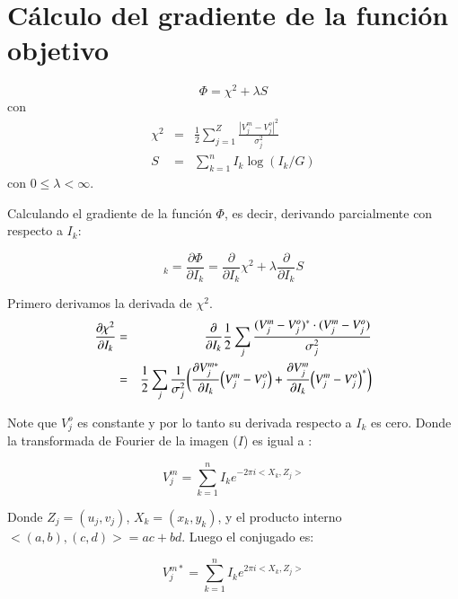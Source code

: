 \chapter{Cálculo del gradiente de la función objetivo}
\label{apendice:dphi}
\begin{equation}
\Phi = \chi^2 + \lambda S
\end{equation}
con
\begin{eqnarray}
\chi^2 & = & \frac{1}{2}\sum^{Z}_{j=1}{\frac{|V^{m}_{j} - V_{j}^{o}|^{2}}{\sigma_j^{2}}} \\
S & = & \sum^{n}_{k=1}{I_{k}\log{(I_{k}/G)}}
\end{eqnarray}
con $0 \leq \lambda < \infty$.

Calculando el gradiente de la función $\Phi$, es decir, derivando parcialmente con respecto a $I_{k}$:

\begin{equation}
[\nabla\Phi]_k = \frac{\partial \Phi}{\partial I_{k}} = \frac{\partial}{\partial I_{k}} \chi^{2} + \lambda \frac{\partial}{\partial I_{k}}S
\label{eq:fina}
\end{equation}



Primero derivamos la derivada de $\chi^2$.
\begin{eqnarray}
\frac{\partial\chi^{2}}{\partial I_{k}} & = & \frac{\partial}{\partial I_{k}}\frac{1}{2}\sum\limits_{j}\frac{(V^{m}_{j} - V_{j}^{o})^{*}\cdot(V^{m}_{j} - V_{j}^{o})}{\sigma_{j}^{2}}\\
                                        & = & \frac{1}{2}\sum\limits_{j}\frac{1}{\sigma_{j}^{2}}\bigg(\frac{\partial
                                         V^{m*}_{j}}{\partial I_{k}}\Bigl( V_{j}^{m} - V_{j}^{o}\Bigr)+\frac{\partial V_{j}^{m}}{\partial I_{k}}\Bigl(V_{j}^{m}- V_{j}^{o}\Bigr)^{*}\biggr)
\end{eqnarray}

Note que $V_j^{o}$ es constante y por lo tanto su derivada respecto a $I_k$ es cero.
Donde la transformada de Fourier de la imagen ($I$) es igual a :

\begin{equation}
V_{j}^{m}=\sum^{n}_{k=1}I_{k}e^{-2\pi i<X_k,Z_j>}
\end{equation}

Donde $Z_j=(u_j,v_j)$, $X_k=(x_k,y_k)$, y el producto interno $<(a,b),(c,d)>=ac+bd$. Luego el conjugado es:

\begin{equation}
V_{j}^{m*}=\sum^{n}_{k=1}I_{k}e^{2\pi i<X_k,Z_j>}
\end{equation}

